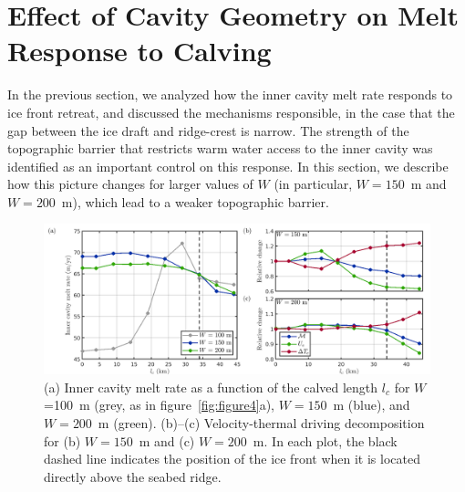 \documentclass[draft]{agujournal2019}
\begin{document}
\section{Effect of Cavity Geometry on Melt Response to Calving}\label{S:Results:H}
In the previous section, we analyzed how the inner cavity melt rate responds to ice front retreat, and discussed the mechanisms responsible, in the case that the gap between the ice draft and ridge-crest is narrow. The strength of the topographic barrier that restricts warm water access to the inner cavity was identified as an important control on this response. In this section, we describe how this picture changes for larger values of $W$ (in particular, $W=150$~m and $W=200$~m), which lead to a weaker topographic barrier.



\begin{figure}
    \centering
    \includegraphics[width = \textwidth]{../make_figures/plots/figure6.png}
    \caption{(a) Inner cavity melt rate as a function of the calved length $l_c$ for $W$=100~m (grey, as in figure~\ref{fig:figure4}a), $W=150$~m (blue), and $W=200$~m (green).  (b)--(c) Velocity-thermal driving decomposition for (b) $W = 150$~m and (c) $W = 200$~m. In each plot, the black dashed line indicates the position of the ice front when it is located directly above the seabed ridge.}
    \label{fig:figure6}
\end{figure}
\end{document}

